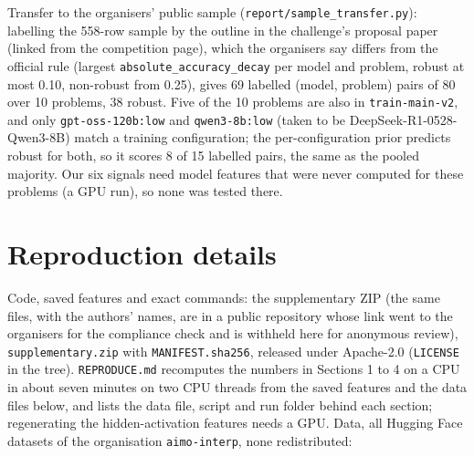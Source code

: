 \documentclass{article}
\begin{document}
Transfer to the organisers' public sample (\texttt{report/sample\_transfer.py}): labelling the 558-row sample by the outline in the challenge's proposal paper (linked from the competition page), which the organisers say differs from the official rule
(largest \texttt{absolute\_accuracy\_decay} per model and problem, robust at most 0.10, non-robust from 0.25), gives 69 labelled
(model, problem) pairs of 80 over 10 problems, 38 robust. Five of the 10 problems are also in \texttt{train-main-v2}, and only
\texttt{gpt-oss-120b:low} and \texttt{qwen3-8b:low} (taken to be DeepSeek-R1-0528-Qwen3-8B) match a training configuration; the per-configuration prior
predicts robust for both, so it scores 8 of 15 labelled pairs, the same as the pooled majority. Our six signals need model features
that were never computed for these problems (a GPU run), so none was tested there.

\section{Reproduction details}

Code, saved features and exact commands: the supplementary ZIP (the same files, with the authors' names, are in a public repository whose link went to the organisers for the compliance check and is withheld here for anonymous review), \texttt{supplementary.zip} with \texttt{MANIFEST.sha256}, released under Apache-2.0 (\texttt{LICENSE} in the tree).
\texttt{REPRODUCE.md} recomputes the numbers in Sections 1 to 4 on a CPU in about seven minutes on two CPU threads from the
saved features and the data files below, and lists the data file, script and run folder behind each section; regenerating the
hidden-activation features needs a GPU. Data, all Hugging Face datasets of the organisation \texttt{aimo-interp}, none redistributed:
\end{document}
